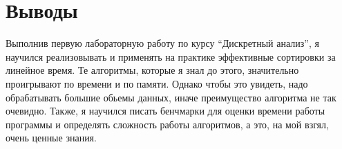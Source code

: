 \section{Выводы}

Выполнив первую лабораторную работу по курсу \enquote{Дискретный анализ}, я научился реализовывать и применять на практике эффективные сортировки за линейное время. Те алгоритмы, которые я знал до этого, значительно проигрывают по времени и по памяти. Однако чтобы это увидеть, надо обрабатывать большие обьемы данных, иначе преимущество алгоритма не так очевидно. Также, я научился писать бенчмарки для оценки времени работы программы и определять сложность работы алгоритмов, а это, на мой взгял, очень ценные знания.   
\pagebreak